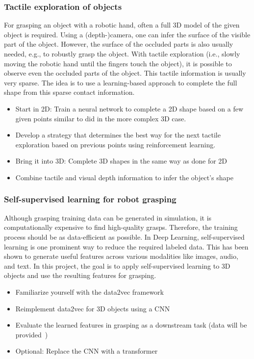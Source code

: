 \documentclass[a4paper]{article}
\begin{document}
\subsubsection{Tactile exploration of objects}
For grasping an object with a robotic hand, often a full 3D model of the given object is required.
Using a (depth-)camera, one can infer the surface of the visible part of the object. However, the surface of the occluded parts is also usually needed, e.g., to robustly grasp the object.
With tactile exploration (i.e., slowly moving the robotic hand until the fingers touch the object), it is possible to observe even the occluded parts of the object.
This tactile information is usually very sparse. The idea is to use a learning-based approach to complete the full shape from this sparse contact information.

\begin{itemize}
  \item Start in 2D: Train a neural network to complete a 2D shape based on a few given points similar to \citet{watkins2019multi} did in the more complex 3D case.
  \item Develop a strategy that determines the best way for the next tactile exploration based on previous points using reinforcement learning.
  \item Bring it into 3D: Complete 3D shapes in the same way as done for 2D
  \item Combine tactile and visual depth information to infer the object's shape
\end{itemize}

\subsubsection{Self-supervised learning for robot grasping}
Although grasping training data can be generated in simulation, it is computationally expensive to find high-quality grasps.
Therefore, the training process should be as data-efficient as possible.
In Deep Learning, self-supervised learning is one prominent way to reduce the required labeled data.
This has been shown to generate useful features across various modalities like images, audio, and text.
In this project, the goal is to apply self-supervised learning to 3D objects and use the resulting features for grasping.
\begin{itemize}
  \item Familiarize yourself with the data2vec framework~\cite{baevski2022data2vec}
  \item Reimplement data2vec for 3D objects using a CNN
  \item Evaluate the learned features in grasping as a downstream task (data will be provided~\cite{winkelbauer2022})
  \item Optional: Replace the CNN with a transformer
\end{itemize}
\end{document}
